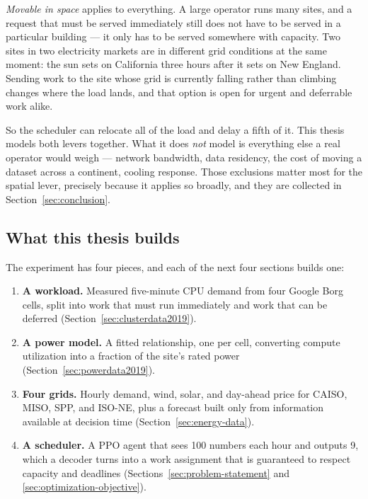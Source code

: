 ﻿\documentclass[12pt]{article}
\begin{document}
\emph{Movable in space} applies to everything. A large operator runs many sites,
and a request that must be served immediately still does not have to be served
in a particular building --- it only has to be served somewhere with capacity.
Two sites in two electricity markets are in different grid conditions at the same
moment: the sun sets on California three hours after it sets on New England.
Sending work to the site whose grid is currently falling rather than climbing
changes where the load lands, and that option is open for urgent and deferrable
work alike.

So the scheduler can relocate all of the load and delay a fifth of it. This
thesis models both levers together. What it does \emph{not} model is everything
else a real operator would weigh --- network bandwidth, data residency, the cost
of moving a dataset across a continent, cooling response. Those exclusions
matter most for the spatial lever, precisely because it applies so broadly, and
they are collected in Section~\ref{sec:conclusion}.

\subsection{What this thesis builds}
\label{subsec:intro-what}

The experiment has four pieces, and each of the next four sections builds one:

\begin{enumerate}
  \item \textbf{A workload.} Measured five-minute CPU demand from four Google
        Borg cells, split into work that must run immediately and work that can
        be deferred (Section~\ref{sec:clusterdata2019}).
  \item \textbf{A power model.} A fitted relationship, one per cell, converting
        compute utilization into a fraction of the site's rated power
        (Section~\ref{sec:powerdata2019}).
  \item \textbf{Four grids.} Hourly demand, wind, solar, and day-ahead price for
        CAISO, MISO, SPP, and ISO-NE, plus a forecast built only from
        information available at decision time
        (Section~\ref{sec:energy-data}).
  \item \textbf{A scheduler.} A PPO agent that sees 100 numbers each hour and
        outputs 9, which a decoder turns into a work assignment that is
        guaranteed to respect capacity and deadlines
        (Sections~\ref{sec:problem-statement} and
        \ref{sec:optimization-objective}).
\end{enumerate}
\end{document}
